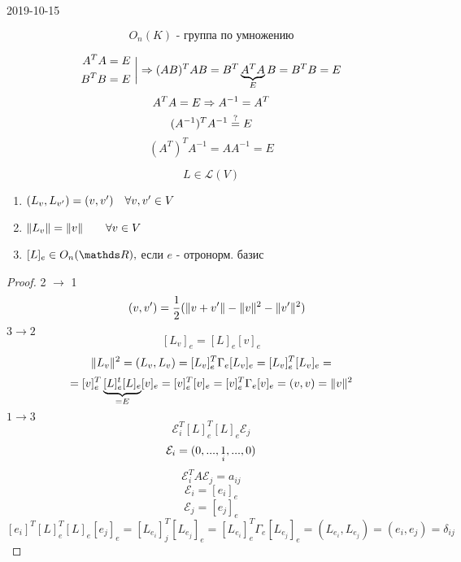 \documentclass[12pt, fleqn]{article}
\begin{document}
\begin{lect} {2019-10-15}
		\begin{Utv}
			\[O_n(K) \text{ - группа по умножению}\]
		\end{Utv}

		\begin{Proof}
		    \[\begin{align}
		    		A^T A = E\\
					B^T B = E
				\end{align} \  \bigg| \Rightarrow (AB)^T AB = B^T \underbrace{A^TA}_E B = B^T B = E\]
				\[A^T A = E \Rightarrow A^{-1} = A^T \]
				\[(A^{-1})^T A^{-1} \overset{?}{=} E \]
				\[(A^T)^T A^{-1}  = AA^{-1}  = E\]
		\end{Proof}

		\begin{Utv}
			\[L \in \mathscr{L}(V)\]
			\begin{enumerate}
				\item $(L_v, L_{v'}) = (v, v') \quad \forall v, v' \in V$
				\item $\lVert L_v \rVert = \lVert v \rVert \quad\quad \forall v \in V$
				\item $[L]_e \in O_n(\R), $ если $e$ - отронорм. базис
			\end{enumerate}
		\end{Utv}

		\begin{proof}
			2 $\to$ 1
			\[\quad(v, v') = \frac{1}{2}(\lVert v + v' \rVert - \lVert v \rVert^2 - \lVert v' \rVert^2)\]
			$3 \to 2$
			\[[L_v]_e = [L]_e [v]_e\]
			\[\lVert L_v \rVert^2 = (L_v, L_v) = [L_v]^T_e \Gamma_e [L_v]_e = [L_v]^T_e [L_v]_e = \]
			\[= [v]_e^T \underbrace{[L]_e^t [L]_e}_{= E} [v]_e  = [v]^T_e [v]_e = 
			[v]^T_e \Gamma_e [v]_e = (v, v) = \lVert v \rVert^2\]
			$1 \to 3$
			\[\mathcal{E}_i^T [L]_e^T [L]_e \mathcal{E}_j\]
			\[\mathcal{E}_i = (0, ..., \underset{i}{1}, ..., 0)\]
			\[\mathcal{E}_i^T A \mathcal{E}_j = a_{ij} \]
			\[\mathcal{E}_i = [e_i]_e\]
			\[\mathcal{E}_j = [e_j]_e\]
			\[[e_i]^T [L]_e^T [L]_e [e_j]_e = [L_{e_i}]_j^T [L_{e_j}]_e = [L_{e_i}]_e^T \Gamma_e 
			[L_{e_j}]_e = (L_{e_i}, L_{e_j}) = (e_i, e_j) = \delta_{ij} \]
		\end{proof}
\end{lect}
\end{document}
